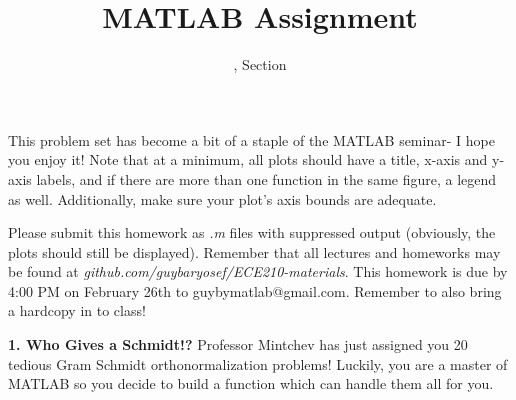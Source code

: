 \documentclass[11pt]{article}
\title{MATLAB Assignment \Homework}
\author{\Session, Section \Section}
\date{}
\makeatletter
\def\MyEmail{guybymatlab@gmail.com}
\def\DateOfSubmission{February 26th }
\makeatother
\begin{document}
\maketitle
This problem set has become a bit of a staple of the MATLAB seminar- I hope you enjoy it!
Note that at a minimum, all plots should have a title, x-axis and y-axis labels,
and if there are more than one function in the same figure, a legend as well.
Additionally, make sure your plot's axis bounds are adequate. 

Please submit this homework as \textit{.m} files 
with suppressed output (obviously, the plots should still be displayed).
Remember that all lectures and homeworks may be found at 
\textit{github.com/guybaryosef/ECE210-materials}.
This homework is due by 4:00 PM on \DateOfSubmission to \MyEmail.
Remember to also bring a hardcopy in to class!


\noindent
\newline
\textbf{1. Who Gives a Schmidt!?}
Professor Mintchev has just assigned you 20 tedious Gram Schmidt orthonormalization problems!
Luckily, you are a master of MATLAB so you decide to build a function which can handle them all
for you.
\end{document}
